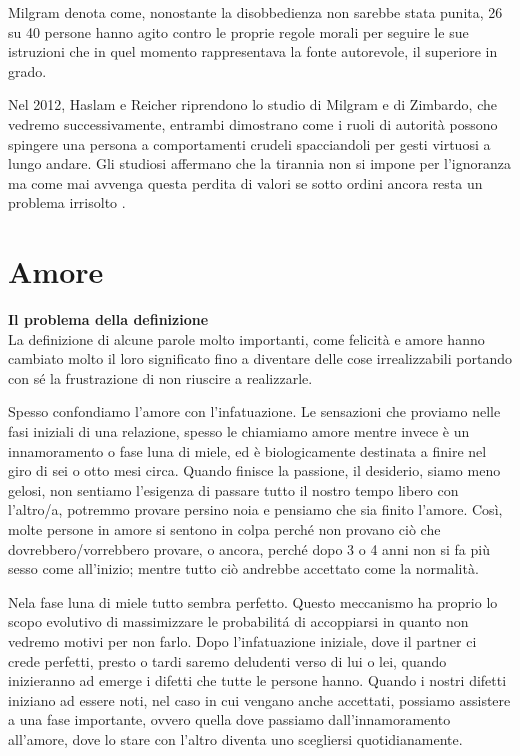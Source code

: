 \documentclass[12pt]{book} %
\begin{document}
\begin{mdframed}[linewidth=1pt]
Milgram denota come, nonostante la disobbedienza non sarebbe stata punita, 26 su 40 persone hanno agito contro le
proprie regole morali per seguire le sue istruzioni che in quel momento rappresentava la fonte autorevole, il superiore
in grado.


\bigskip

Nel 2012, Haslam e Reicher riprendono lo studio di Milgram e di Zimbardo, che vedremo successivamente, entrambi
dimostrano come i ruoli di autorità possono spingere una persona a comportamenti crudeli spacciandoli per gesti
virtuosi a lungo andare. Gli studiosi affermano che la tirannia non si impone per l'ignoranza ma
come mai avvenga questa perdita di valori se sotto ordini ancora resta un problema
irrisolto
. 
\end{mdframed}

\clearpage\section{Amore}
\noindent \textbf{\large Il problema della definizione} \\
La definizione di alcune parole molto importanti, come felicità e amore hanno cambiato molto il loro significato fino a diventare delle cose irrealizzabili portando con sé la frustrazione di non riuscire a realizzarle.

Spesso confondiamo l'amore con l'infatuazione. Le sensazioni che proviamo nelle fasi iniziali di una relazione, spesso le chiamiamo amore mentre invece è un innamoramento o fase luna di miele, ed è
biologicamente destinata a finire nel giro di sei o otto mesi circa. Quando finisce la passione, il desiderio, siamo meno gelosi, non sentiamo
l'esigenza di passare tutto il nostro tempo libero con l'altro/a, potremmo provare persino
noia e pensiamo che sia finito l'amore. Così, molte persone in amore si sentono
in colpa perché non provano ciò che dovrebbero/vorrebbero provare, o ancora, perché dopo 3 o 4 anni non si fa più sesso come all'inizio; mentre tutto ciò andrebbe accettato come la normalità.

Nela fase luna di miele tutto sembra perfetto. Questo meccanismo ha proprio lo scopo evolutivo di massimizzare le probabilitá di accoppiarsi in quanto non vedremo motivi per non farlo. Dopo l'infatuazione iniziale, dove il partner ci crede perfetti, presto o tardi saremo
deludenti verso di lui o lei, quando inizieranno ad emerge i difetti che tutte le persone hanno. Quando
i nostri difetti iniziano ad essere noti, nel caso in cui vengano anche accettati, possiamo assistere a una fase
importante, ovvero quella dove passiamo dall'innamoramento all'amore, dove lo
stare con l'altro diventa uno scegliersi quotidianamente. 
\end{document}
